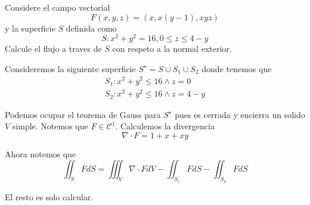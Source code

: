 \message{ !name(MAT024.tex)}\documentclass[../main.tex]{subfiles}
\begin{document}
\begin{problem}
  Considere el campo vectorial
  \begin{equation*}
    F(x, y, z) = (x, x(y - 1), xyz)
  \end{equation*}
  y la superficie $S$ definida como
  \begin{equation*}
    S: x^{2} + y^{2}  = 16, 0 \leq z \leq 4 - y
  \end{equation*}
  Calcule el flujo a traves de $S$ con respeto a la normal exterior.
\end{problem}
\begin{solution}
  Consideremos la siguiente superficie $S^{\star} = S \cup S_{1} \cup S_{2}$ donde tenemos que
  \begin{gather*}
    S_{1}: x^{2} + y^{2} \leq 16 \land z = 0\\
    S_{2}: x^{2} + y^{2} \leq 16 \land z = 4 - y
  \end{gather*}

  Podemos ocupar el teorema de Gauss para $S^{\star}$ pues es cerrada y encierra un solido $V$ simple. Notemos que $F \in \mathcal{C}^{1}$. Calculemos la divergencia
  \begin{equation*}
    \nabla \cdot F = 1 + x + xy
  \end{equation*}

  Ahora notemos que
  \begin{equation*}
    \iint_{S} F dS = \iiint_{V} \nabla \cdot F dV - \iint_{S_{1}} F dS - \iint_{S_{2}} F dS
  \end{equation*}

  El resto es solo calcular.
\end{solution}
\end{document}
